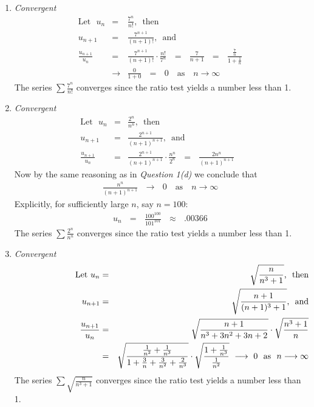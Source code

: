 \documentclass[12pt]{amsart}
\begin{document}
\begin{enumerate}
\begin{enumerate}
			\item \emph{Convergent}
				\begin{eqnarray}
					\text{Let} \text{ } u_n & = & \frac{7^n}{n!} \text{, } \text{ then} \nonumber \\
					u_{n+1} & = & \frac{7^{n+1}}{(n+1)!} \text{, } \text{ and} \nonumber \\
					\frac{u_{n+1}}{u_n} & = &  \frac{7^{n+1}}{(n+1)!} \cdot \frac{n!}{7^n} \text{ } =
					\text{ } \frac{7}{n+1} \text{ } = \text{ } \frac{\frac{7}{n}}{1+\frac{1}{n}} \nonumber \\
					& \longrightarrow & \frac{0}{1+0} \text{ } = \text{ } 0 \text{ } \text{ as } \text{ } n 
					\longrightarrow \infty \nonumber
				\end{eqnarray}
			The series $\sum \frac{7^n}{n!}$ converges since the ratio test yields a number less than 1.
			\bigskip
			\item \emph{Convergent}
				\begin{eqnarray}
					\text{Let} \text{ } u_n & = & \frac{2^n}{n^n} \text{, } \text{ then} \nonumber \\
					u_{n+1} & = & \frac{2^{n+1}}{(n+1)^{n+1}} \text{, } \text{ and} \nonumber \\
					\frac{u_{n+1}}{u_n} & = & \frac{2^{n+1}}{(n+1)^{n+1}} \cdot \frac{n^n}{2^n} \text{ } =
					\text{ } \frac{2n^n}{(n+1)^{n+1}} \text{ } \nonumber
				\end{eqnarray}
			Now by the same reasoning as in \textit{Question 1(d)} we conclude that 
				\begin{eqnarray}
					\frac{n^n}{(n+1)^{n+1}} \text{ } \longrightarrow \text{ } 0 \text{ } \text{ as } \text{ } n 					 	\longrightarrow \infty \nonumber
				\end{eqnarray}
			Explicitly, for sufficiently large $n$, say $n=100:$
				\begin{eqnarray}
					u_n \text{ } = \text{ } \frac{100^{100}}{101^{101}} \text{ } \approx \text{ } .00366 							\nonumber
				\end{eqnarray}
			The series $\sum \frac{2^n}{n^n}$ converges since the ratio test yields a number less than 1.
			\bigskip
			\item	\emph{Convergent}
				\begin{eqnarray}
					\hspace{2.5cm} \text{Let} \text{ } u_n & = & \sqrt{\frac{n}{n^3+1}} \text{, } \text{ then} 						\nonumber \\
					u_{n+1} & = & \sqrt{\frac{{n+1}}{(n+1)^3+1}} \text{, } \text{ and} \nonumber \\
					\frac{u_{n+1}}{u_n} & = & \sqrt{\frac{{n+1}}{n^3+3n^2+3n+2}} \cdot 
					\sqrt{\frac{n^3+1}{n}} \nonumber \\
					& = &  \sqrt{\frac{{\frac{1}{n^2}+\frac{1}{n^3}}}{1+\frac{3}{n}+\frac{3}{n^2}+
					\frac{2}{n^3}}} \cdot \sqrt{\frac{1+\frac{1}{n^3}}{\frac{1}{n^2}}} \text{ } \longrightarrow 						\text{ } 0 \text{ } \text{ as } \text{ } n \longrightarrow \infty \nonumber
				\end{eqnarray}
			The series $\sum \sqrt{\frac{n}{n^3+1}}$ converges since the ratio test yields a number less 
			than 1.
		\end{enumerate}

\end{enumerate}
	
\end{document}
